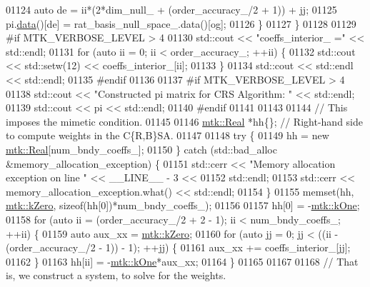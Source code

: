 \begin{DoxyCode}
{{01124       \textcolor{keyword}{auto} de = ii*(2*dim\_null\_ + (order\_accuracy\_/2 + 1)) + jj;
01125       pi.\hyperlink{classmtk_1_1DenseMatrix_a0c33b8a9e01d157c61ddbdf807c25d84}{data}()[de] = rat\_basis\_null\_space\_.data()[og];
01126     \}
01127   \}
01128 
01129 \textcolor{preprocessor}{  #if MTK\_VERBOSE\_LEVEL > 4}
01130   std::cout << \textcolor{stringliteral}{"coeffs\_interior\_ ="} << std::endl;
01131   \textcolor{keywordflow}{for} (\textcolor{keyword}{auto} ii = 0; ii < order\_accuracy\_; ++ii) \{
01132     std::cout << std::setw(12) << coeffs\_interior\_[ii];
01133   \}
01134   std::cout << std::endl << std::endl;
01135 \textcolor{preprocessor}{  #endif}
01136 
01137 \textcolor{preprocessor}{  #if MTK\_VERBOSE\_LEVEL > 4}
01138   std::cout << \textcolor{stringliteral}{"Constructed pi matrix for CRS Algorithm: "} << std::endl;
01139   std::cout << pi << std::endl;
01140 \textcolor{preprocessor}{  #endif}
01141 
01143 
01144   \textcolor{comment}{// This imposes the mimetic condition.}
01145 
01146   \hyperlink{group__c01-roots_gac080bbbf5cbb5502c9f00405f894857d}{mtk::Real} *hh\{\};  \textcolor{comment}{// Right-hand side to compute weights in the C\{R,B\}SA.}
01147 
01148   \textcolor{keywordflow}{try} \{
01149     hh = \textcolor{keyword}{new} \hyperlink{group__c01-roots_gac080bbbf5cbb5502c9f00405f894857d}{mtk::Real}[num\_bndy\_coeffs\_];
01150   \} \textcolor{keywordflow}{catch} (std::bad\_alloc &memory\_allocation\_exception) \{
01151     std::cerr << \textcolor{stringliteral}{"Memory allocation exception on line "} << \_\_LINE\_\_ - 3 <<
01152       std::endl;
01153     std::cerr << memory\_allocation\_exception.what() << std::endl;
01154   \}
01155   memset(hh, \hyperlink{group__c01-roots_ga59a451a5fae30d59649bcda274fea271}{mtk::kZero}, \textcolor{keyword}{sizeof}(hh[0])*num\_bndy\_coeffs\_);
01156 
01157   hh[0] = -\hyperlink{group__c01-roots_ga26407c24d43b6b95480943340d285c71}{mtk::kOne};
01158   \textcolor{keywordflow}{for} (\textcolor{keyword}{auto} ii = (order\_accuracy\_/2 + 2 - 1); ii < num\_bndy\_coeffs\_; ++ii) \{
01159     \textcolor{keyword}{auto} aux\_xx = \hyperlink{group__c01-roots_ga59a451a5fae30d59649bcda274fea271}{mtk::kZero};
01160     \textcolor{keywordflow}{for} (\textcolor{keyword}{auto} jj = 0; jj < ((ii - (order\_accuracy\_/2 - 1)) - 1); ++jj) \{
01161       aux\_xx += coeffs\_interior\_[jj];
01162     \}
01163     hh[ii] = -\hyperlink{group__c01-roots_ga26407c24d43b6b95480943340d285c71}{mtk::kOne}*aux\_xx;
01164   \}
01165 
01167 
01168   \textcolor{comment}{// That is, we construct a system, to solve for the weights.}
}}
\end{DoxyCode}
